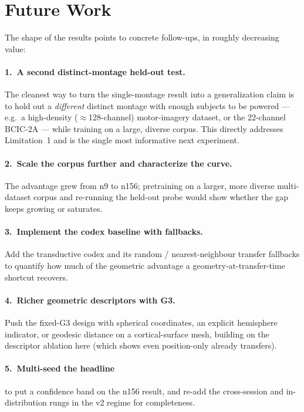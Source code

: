 \documentclass[11pt]{article}
\begin{document}
\section{Future Work}
\label{sec:future}

The shape of the results points to concrete follow-ups, in roughly decreasing
value:

\paragraph{1.\ A second distinct-montage held-out test.}
The cleanest way to turn the single-montage result into a generalization
claim is to hold out a \emph{different} distinct montage with enough subjects
to be powered --- e.g.\ a high-density ($\approx$128-channel) motor-imagery
dataset, or the 22-channel BCIC-2A --- while training on a large, diverse
corpus. This directly addresses Limitation~1 and is the single most
informative next experiment.

\paragraph{2.\ Scale the corpus further and characterize the curve.}
The advantage grew from n9 to n156; pretraining on a larger, more diverse
multi-dataset corpus and re-running the held-out probe would show whether the
gap keeps growing or saturates.

\paragraph{3.\ Implement the codex baseline with fallbacks.}
Add the transductive codex and its random / nearest-neighbour transfer
fallbacks to quantify how much of the geometric advantage a
geometry-at-transfer-time shortcut recovers.

\paragraph{4.\ Richer geometric descriptors with G3.}
Push the fixed-G3 design with spherical coordinates, an explicit hemisphere
indicator, or geodesic distance on a cortical-surface mesh, building on the
descriptor ablation here (which shows even position-only already transfers).

\paragraph{5.\ Multi-seed the headline}
to put a confidence band on the n156 result, and re-add the cross-session and
in-distribution rungs in the v2 regime for completeness.
\end{document}
